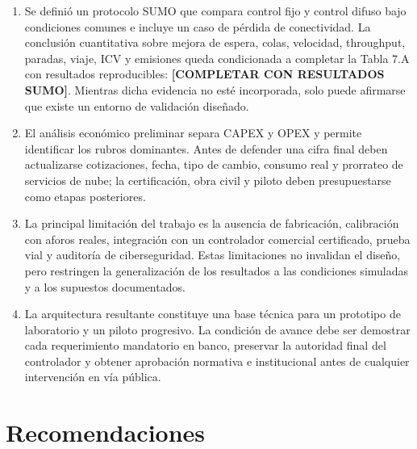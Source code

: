 \documentclass[12pt,a4paper,oneside]{report}
\begin{document}
\begin{enumerate}
\item Se definió un protocolo SUMO que compara control fijo y control difuso bajo condiciones comunes e incluye un caso de pérdida de conectividad. La conclusión cuantitativa sobre mejora de espera, colas, velocidad, throughput, paradas, viaje, ICV y emisiones queda condicionada a completar la Tabla 7.A con resultados reproducibles: \textbf{[COMPLETAR CON RESULTADOS SUMO]}. Mientras dicha evidencia no esté incorporada, solo puede afirmarse que existe un entorno de validación diseñado.

\item El análisis económico preliminar separa CAPEX y OPEX y permite identificar los rubros dominantes. Antes de defender una cifra final deben actualizarse cotizaciones, fecha, tipo de cambio, consumo real y prorrateo de servicios de nube; la certificación, obra civil y piloto deben presupuestarse como etapas posteriores.

\item La principal limitación del trabajo es la ausencia de fabricación, calibración con aforos reales, integración con un controlador comercial certificado, prueba vial y auditoría de ciberseguridad. Estas limitaciones no invalidan el diseño, pero restringen la generalización de los resultados a las condiciones simuladas y a los supuestos documentados.

\item La arquitectura resultante constituye una base técnica para un prototipo de laboratorio y un piloto progresivo. La condición de avance debe ser demostrar cada requerimiento mandatorio en banco, preservar la autoridad final del controlador y obtener aprobación normativa e institucional antes de cualquier intervención en vía pública.
\end{enumerate}

\section*{Recomendaciones}
\end{document}
